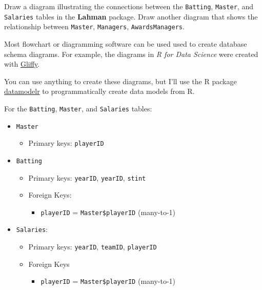 \documentclass[]{book}
\providecommand{\tightlist}{%
  \setlength{\itemsep}{0pt}\setlength{\parskip}{0pt}}
\theoremstyle{definition}
\theoremstyle{definition}
\theoremstyle{definition}
\theoremstyle{remark}
\begin{document}
Draw a diagram illustrating the connections between the
\texttt{Batting}, \texttt{Master}, and \texttt{Salaries} tables in the
\textbf{Lahman} package. Draw another diagram that shows the
relationship between \texttt{Master}, \texttt{Managers},
\texttt{AwardsManagers}.

Most flowchart or diagramming software can be used used to create
database schema diagrams. For example, the diagrams in \emph{R for Data
Science} were created with \href{https://www.gliffy.com/}{Gliffy}.

You can use anything to create these diagrams, but I'll use the R
package \href{https://github.com/bergant/datamodelr}{datamodelr} to
programmatically create data models from R.

For the \texttt{Batting}, \texttt{Master}, and \texttt{Salaries} tables:

\begin{itemize}
\tightlist
\item
  \texttt{Master}

  \begin{itemize}
  \tightlist
  \item
    Primary keys: \texttt{playerID}
  \end{itemize}
\item
  \texttt{Batting}

  \begin{itemize}
  \tightlist
  \item
    Primary keys: \texttt{yearID}, \texttt{yearID}, \texttt{stint}
  \item
    Foreign Keys:

    \begin{itemize}
    \tightlist
    \item
      \texttt{playerID} = \texttt{Master\$playerID} (many-to-1)
    \end{itemize}
  \end{itemize}
\item
  \texttt{Salaries}:

  \begin{itemize}
  \tightlist
  \item
    Primary keys: \texttt{yearID}, \texttt{teamID}, \texttt{playerID}
  \item
    Foreign Keys

    \begin{itemize}
    \tightlist
    \item
      \texttt{playerID} = \texttt{Master\$playerID} (many-to-1)
    \end{itemize}
  \end{itemize}
\end{itemize}
\end{document}
